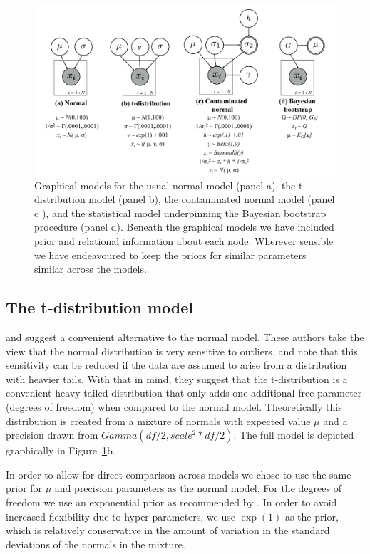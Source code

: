 \documentclass[doc]{apa6}
\begin{document}
{\begin{figure}[t]
    \centering
    \includegraphics[width=15cm]{graphicalmodels.png} \vspace*{6pt}
    \caption{Graphical models for the usual normal model (panel a),  the t-distribution model (panel b),   the contaminated normal model (panel    c ), and the statistical model underpinning the Bayesian bootstrap procedure (panel       d).   Beneath the graphical models we have included prior and relational information about each node. Wherever sensible we have endeavoured to keep the priors for similar parameters similar across the models.}
    \label{graphicalmodels}
\end{figure}


\subsection{The t-distribution model}
\textcite{andrade2011bayesian} and \textcite{kruschke2013bayesian} suggest a convenient alternative to the normal model. These authors take the view that the normal distribution is very sensitive to outliers, and note that this sensitivity can be reduced if the data are assumed to arise from a distribution with heavier tails. With that in mind, they suggest that the t-distribution is a convenient heavy tailed distribution that only adds one additional free parameter (degrees of freedom) when compared to the normal model. Theoretically this distribution is created from a mixture of normals with expected value $\mu$ and a precision drawn from $Gamma(df/2, scale^2*df/2)$. The full model is depicted graphically in Figure~\ref{graphicalmodels}b.

In order to allow for direct comparison across models we chose to use the same prior for $\mu$ and precision parameters as the normal model. For the degrees of freedom we use an exponential prior as recommended by \textcite{kruschke2013bayesian}. In order to avoid increased flexibility due to hyper-parameters, we use $\exp(1)$ as the prior, which is relatively conservative in the amount of variation in the standard deviations of the normals in the mixture.

}
\end{document}

